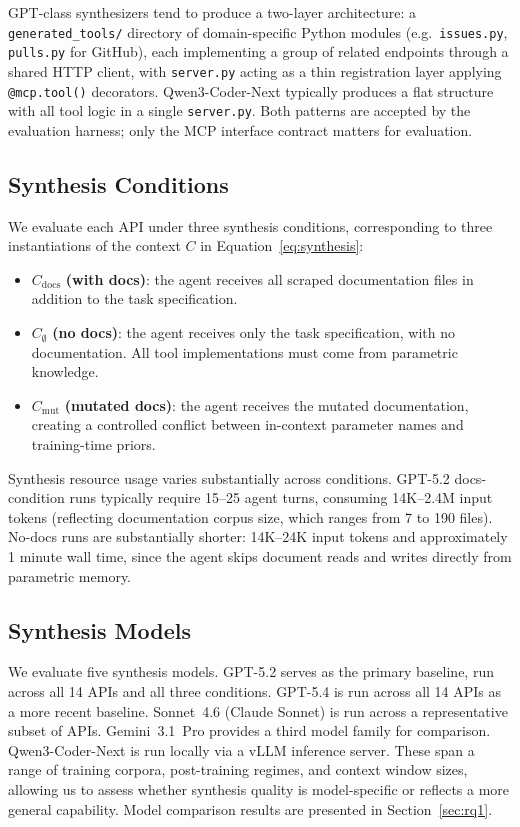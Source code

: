 \documentclass[12pt]{report}
\begin{document}
\noindent
GPT-class synthesizers tend to produce a two-layer architecture: a
\texttt{generated\_tools/} directory of domain-specific Python modules
(e.g.\ \texttt{issues.py}, \texttt{pulls.py} for GitHub), each implementing
a group of related endpoints through a shared HTTP client, with
\texttt{server.py} acting as a thin registration layer applying
\texttt{@mcp.tool()} decorators. Qwen3-Coder-Next typically produces a flat
structure with all tool logic in a single \texttt{server.py}. Both patterns
are accepted by the evaluation harness; only the MCP interface contract
matters for evaluation.

\subsection{Synthesis Conditions}

We evaluate each API under three synthesis conditions, corresponding to three
instantiations of the context $C$ in Equation~\ref{eq:synthesis}:

\begin{itemize}
  \item $C_{\text{docs}}$ \textbf{(with docs)}: the agent receives all
    scraped documentation files in addition to the task specification.
  \item $C_{\emptyset}$ \textbf{(no docs)}: the agent receives only the
    task specification, with no documentation. All tool implementations must
    come from parametric knowledge.
  \item $C_{\text{mut}}$ \textbf{(mutated docs)}: the agent receives the
    mutated documentation, creating a controlled conflict between in-context
    parameter names and training-time priors.
\end{itemize}

\noindent
Synthesis resource usage varies substantially across conditions. GPT-5.2
docs-condition runs typically require 15--25 agent turns, consuming
14K--2.4M input tokens (reflecting documentation corpus size, which ranges
from 7 to 190 files). No-docs runs are substantially shorter: 14K--24K input
tokens and approximately 1 minute wall time, since the agent skips document
reads and writes directly from parametric memory.

\subsection{Synthesis Models}

We evaluate five synthesis models. GPT-5.2 serves as the primary baseline,
run across all 14 APIs and all three conditions. GPT-5.4 is run across all
14 APIs as a more recent baseline. Sonnet~4.6 (Claude Sonnet) is run across
a representative subset of APIs. Gemini~3.1~Pro provides a third model family
for comparison. Qwen3-Coder-Next is run locally via a vLLM inference server.
These span a range of training corpora, post-training regimes, and context
window sizes, allowing us to assess whether synthesis quality is model-specific
or reflects a more general capability. Model comparison results are presented
in Section~\ref{sec:rq1}.
\end{document}
